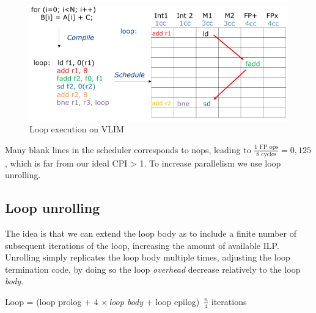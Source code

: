 \begin{figure}[h]
    \centering
    \includegraphics[scale = 0.4]{images/vliw-no-loop-unrolling}
    \caption{Loop execution on VLIM}
    \label{fig:vliw-no-loop-unrolling}
\end{figure}

Many blank lines in the scheduler corresponds to nops, leading to \(\frac{1\text{ FP ops}}{8\text{ cycles}} = 0,125\)
, which is far from our ideal CPI > 1.
To increase parallelism we use loop unrolling.

\subsection{Loop unrolling}\label{subsec:loop-unrolling}
The idea is that we can extend the loop body as to include a finite number of subsequent iterations of the loop,
increasing the amount of available ILP\@.
Unrolling simply replicates the loop body multiple times, adjusting the loop termination code, by doing so the loop
\textit{overhead} decrease relatively to the loop \textit{body}.

\begin{center}
    Loop = (loop prolog + \(4\, \times\)\textit{loop body} + loop epilog) \texttimes $\, \frac{n}{4}$ iterations
\end{center}

